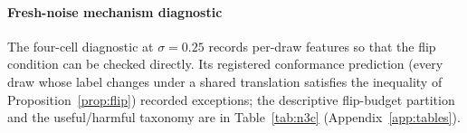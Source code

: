 \paragraph{Fresh-noise mechanism diagnostic}
The four-cell diagnostic at $\sigma=0.25$ records per-draw features so that
the flip condition can be checked directly. Its registered conformance
prediction (every draw whose label changes under a shared translation
satisfies the inequality of Proposition~\ref{prop:flip}) recorded
\NthreeCPone{} exceptions; the descriptive flip-budget partition and the
useful/harmful taxonomy are in Table~\ref{tab:n3c} (Appendix~\ref{app:tables}).
